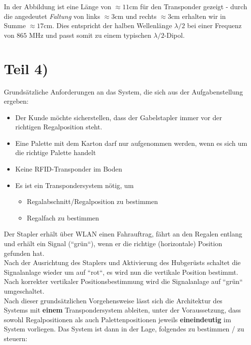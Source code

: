 \noindent
In der Abbildung ist eine Länge von $\approx 11$cm für den Transponder gezeigt - durch die angedeutet \textit{Faltung} von links $\approx 3$cm und rechts $\approx 3$cm erhalten wir in Summe $\approx 17$cm.
Dies entspricht der halben Wellenlänge $\lambda / 2$ bei einer Frequenz von $865$ MHz und passt somit zu einem typischen $\lambda/2$-Dipol.


\section{Teil 4)}\label{sec:2_4}

Grundsätzliche Anforderungen an das System, die sich aus der Aufgabenstellung ergeben:

\begin{itemize}
    \itemsep0.5em
    \item Der Kunde möchte sicherstellen, dass der Gabelstapler immer vor der richtigen Regalposition steht.
    \item Eine Palette mit dem Karton darf nur aufgenommen werden, wenn es sich um die richtige Palette handelt
    \item Keine RFID-Transponder im Boden
    \item Es ist ein Transpondersystem nötig, um
    \begin{itemize}
        \item Regalabschnitt/Regalposition zu bestimmen
        \item Regalfach zu bestimmen
    \end{itemize}
\end{itemize}

\noindent
Der Stapler erhält über WLAN einen Fahrauftrag, fährt an den Regalen entlang und erhält ein Signal (``grün``), wenn er die richtige (horizontale) Position gefunden hat.\\
Nach der Ausrichtung des Staplers und Aktivierung des Hubgerüsts schaltet die Signalanlage wieder um auf ``rot``, es wird nun die vertikale Position bestimmt.
Nach korrekter vertikaler Positionsbestimmung wird die Signalanlage auf ``grün`` umgeschaltet.\\

\noindent
Nach dieser grundsätzlichen Vorgehensweise lässt sich die Architektur des Systems mit \textbf{einem} Transpondersystem ableiten, unter der Voraussetzung, dass sowohl Regalpositionen als auch Palettenpositionen jeweils \textbf{eineindeutig} im System vorliegen.
Das System ist dann in der Lage, folgendes zu bestimmen / zu steuern:

